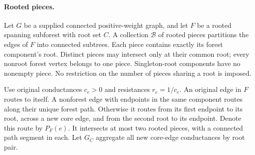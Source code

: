 \paragraph{Rooted pieces.}
Let $G$ be a supplied connected positive-weight graph, and let $F$ be a
rooted spanning subforest with root set $C$. A collection $\mathcal B$
of rooted pieces partitions the edges of $F$ into connected subtrees.
Each piece contains exactly its forest component's root. Distinct pieces
may intersect only at their common root; every nonroot forest vertex
belongs to one piece. Singleton-root components have no nonempty piece.
No restriction on the number of pieces sharing a root is imposed.

Use original conductances $c_e>0$ and resistances $r_e=1/c_e$.
An original edge in $F$ routes to itself. A nonforest edge with endpoints
in the same component routes along their unique forest path. Otherwise
it routes from its first endpoint to its root, across a new core edge,
and from the second root to its endpoint. Denote this route by $P_F(e)$.
It intersects at most two rooted pieces, with a connected path segment
in each. Let $G_C$ aggregate all new core-edge conductances by root pair.

